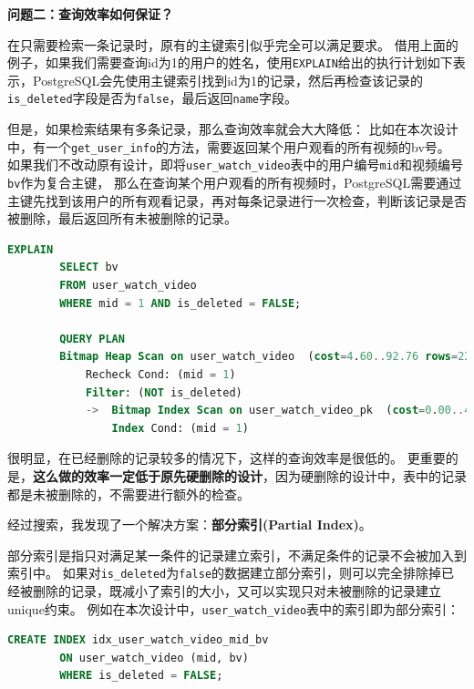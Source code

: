 \documentclass[a4paper,10pt]{ctexart}
\begin{document}
\vspace{0.7cm}
\textbf{问题二：查询效率如何保证？}

在只需要检索一条记录时，原有的主键索引似乎完全可以满足要求。
借用上面的例子，如果我们需要查询id为1的用户的姓名，使用\texttt{EXPLAIN}给出的执行计划如下表示，PostgreSQL会先使用主键索引找到id为1的记录，然后再检查该记录的\texttt{is\_deleted}字段是否为\texttt{false}，最后返回\texttt{name}字段。

但是，如果检索结果有多条记录，那么查询效率就会大大降低：
比如在本次设计中，有一个\texttt{get\_user\_info}的方法，需要返回某个用户观看的所有视频的bv号。
如果我们不改动原有设计，即将\texttt{user\_watch\_video}表中的用户编号\texttt{mid}和视频编号\texttt{bv}作为复合主键，
那么在查询某个用户观看的所有视频时，PostgreSQL需要通过主键先找到该用户的所有观看记录，再对每条记录进行一次检查，判断该记录是否被删除，最后返回所有未被删除的记录。
\begin{center}
    \begin{lstlisting}[language=SQL]
        EXPLAIN
        SELECT bv
        FROM user_watch_video
        WHERE mid = 1 AND is_deleted = FALSE;

        QUERY PLAN
        Bitmap Heap Scan on user_watch_video  (cost=4.60..92.76 rows=23 width=13)
            Recheck Cond: (mid = 1)
            Filter: (NOT is_deleted)
            ->  Bitmap Index Scan on user_watch_video_pk  (cost=0.00..4.60 rows=23 width=0)
                Index Cond: (mid = 1)
    \end{lstlisting}
\end{center}

很明显，在已经删除的记录较多的情况下，这样的查询效率是很低的。
更重要的是，\textbf{这么做的效率一定低于原先硬删除的设计}，因为硬删除的设计中，表中的记录都是未被删除的，不需要进行额外的检查。

\vspace{0.7cm}
经过搜索，我发现了一个解决方案：\textbf{部分索引(Partial Index)}。

部分索引是指只对满足某一条件的记录建立索引，不满足条件的记录不会被加入到索引中。
如果对\texttt{is\_deleted}为\texttt{false}的数据建立部分索引，则可以完全排除掉已经被删除的记录，既减小了索引的大小，又可以实现只对未被删除的记录建立unique约束。
例如在本次设计中，\texttt{user\_watch\_video}表中的索引即为部分索引：
\begin{center}
    \begin{lstlisting}[language=SQL]
        CREATE INDEX idx_user_watch_video_mid_bv
        ON user_watch_video (mid, bv)
        WHERE is_deleted = FALSE;
    \end{lstlisting}
\end{center}
\end{document}

